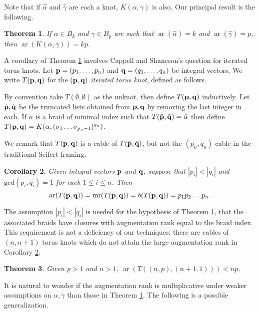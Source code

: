 \documentclass[11pt]{amsart}
\def\s{{\sigma}}
\def\ar{\operatorname{ar}}
\def\mr{\operatorname{mr}}
\newtheorem{thm}{Theorem}[section]
\newtheorem{cor}[thm]{Corollary}
\theoremstyle{definition}
\begin{document}
Note that if $\hat{\alpha}$ and $\hat{\gamma}$ are each a knot, $K(\alpha,\gamma)$ is also. Our principal result is the following.

\begin{thm}\label{main}
If $\alpha\in B_k$ and $\gamma\in B_p$ are such that $\ar(\hat{\alpha})=k$ and $\ar(\hat{\gamma})=p$, then $\ar(K(\alpha,\gamma))=kp$.
\end{thm}

A corollary of Theorem \ref{main} involves Cappell and Shaneson's question for iterated torus knots. Let ${\bf p}=(p_1,\ldots,p_n)$ and ${\bf q}=(q_1,\ldots,q_n)$ be integral vectors. We write $T({\bf p},{\bf q})$ for the $({\bf p},{\bf q})$ \emph{iterated torus knot}, defined as follows. 

By convention take $T(\emptyset,\emptyset)$ as the unknot, then define $T({\bf p},{\bf q})$ inductively. Let $\hat{\bf p}, \hat{\bf q}$ be the truncated lists obtained from ${\bf p},{\bf q}$ by removing the last integer in each. If $\alpha$ is a braid of minimal index such that $T(\hat{\bf p},\hat{\bf q}) = \hat{\alpha}$ then define $T({\bf p},{\bf q}) = K(\alpha,(\s_1\ldots\s_{p_n-1})^{q_n})$. 

We remark that $T({\bf p},{\bf q})$ is a cable of $T(\hat{\bf p},\hat{\bf q})$, but not the $(p_n,q_n)$-cable in the traditional Seifert framing.

\begin{cor}\label{cor:iteratedCables}
Given integral vectors ${\bf p}$ and ${\bf q}$, suppose that $|p_i|<|q_i|$ and $\text{gcd}(p_i,q_i)=1$ for each $1\le i\le n$. Then 
      \[\ar(T({\bf p},{\bf q}))=\mr(T({\bf p},{\bf q})) = b(T({\bf p},{\bf q}))=p_1p_2\ldots p_n.\]
\end{cor}

The assumption $|p_i|<|q_i|$ is needed for the hypothesis of Theorem \ref{main}, that the associated braids have closures with augmentation rank equal to the braid index. This requirement is not a deficiency of our techniques; there are cables of $(n,n+1)$ torus knots which do not attain the large augmentation rank in Corollary \ref{cor:iteratedCables}.

\begin{thm}\label{ThmNNPlus1}Given $p>1$ and $n>1$, $\ar(T((n,p),(n+1,1))) < np$.
\end{thm}

It is natural to wonder if the augmentation rank is multiplicative under weaker assumptions on $\alpha, \gamma$ than those in Theorem \ref{main}. The following is a possible generalization.
\end{document}
